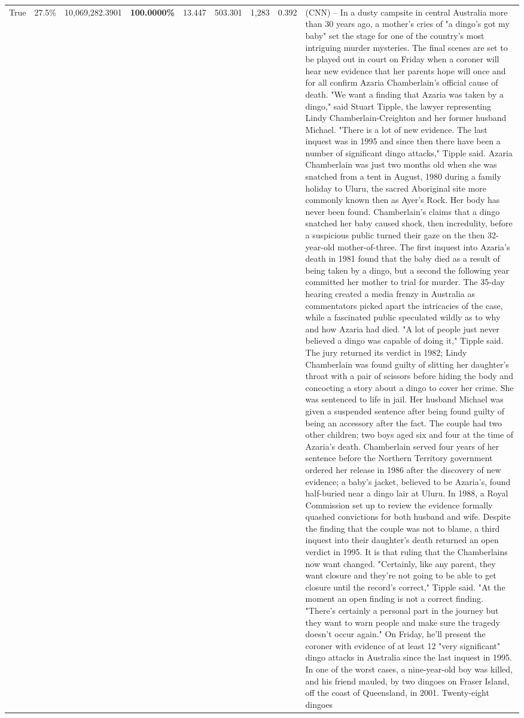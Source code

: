 \begin{table}[H]
\begin{tabular}{lllrlllll}
True & 27.5\% & 10,069,282.3901 & \bfseries \color{red} 100.0000\% & 13.447 & 503.301 & 1,283 & 0.392 & (CNN) -- In a dusty campsite in central Australia more than 30 years ago, a mother's cries of "a dingo's got my baby" set the stage for one of the country's most intriguing murder mysteries. The final scenes are set to be played out in court on Friday when a coroner will hear new evidence that her parents hope will once and for all confirm Azaria Chamberlain's official cause of death. "We want a finding that Azaria was taken by a dingo," said Stuart Tipple, the lawyer representing Lindy Chamberlain-Creighton and her former husband Michael. "There is a lot of new evidence. The last inquest was in 1995 and since then there have been a number of significant dingo attacks," Tipple said. Azaria Chamberlain was just two months old when she was snatched from a tent in August, 1980 during a family holiday to Uluru, the sacred Aboriginal site more commonly known then as Ayer's Rock. Her body has never been found. Chamberlain's claims that a dingo snatched her baby caused shock, then incredulity, before a suspicious public turned their gaze on the then 32-year-old mother-of-three. The first inquest into Azaria's death in 1981 found that the baby died as a result of being taken by a dingo, but a second the following year committed her mother to trial for murder. The 35-day hearing created a media frenzy in Australia as commentators picked apart the intricacies of the case, while a fascinated public speculated wildly as to why and how Azaria had died. "A lot of people just never believed a dingo was capable of doing it," Tipple said. The jury returned its verdict in 1982; Lindy Chamberlain was found guilty of slitting her daughter's throat with a pair of scissors before hiding the body and concocting a story about a dingo to cover her crime. She was sentenced to life in jail. Her husband Michael was given a suspended sentence after being found guilty of being an accessory after the fact. The couple had two other children; two boys aged six and four at the time of Azaria's death. Chamberlain served four years of her sentence before the Northern Territory government ordered her release in 1986 after the discovery of new evidence; a baby's jacket, believed to be Azaria's, found half-buried near a dingo lair at Uluru. In 1988, a Royal Commission set up to review the evidence formally quashed convictions for both husband and wife. Despite the finding that the couple was not to blame, a third inquest into their daughter's death returned an open verdict in 1995. It is that ruling that the Chamberlains now want changed. "Certainly, like any parent, they want closure and they're not going to be able to get closure until the record's correct," Tipple said. "At the moment an open finding is not a correct finding. "There's certainly a personal part in the journey but they want to warn people and make sure the tragedy doesn't occur again." On Friday, he'll present the coroner with evidence of at least 12 "very significant" dingo attacks in Australia since the last inquest in 1995. In one of the worst cases, a nine-year-old boy was killed, and his friend mauled, by two dingoes on Fraser Island, off the coast of Queensland, in 2001. Twenty-eight dingoes 
\end{tabular}
\end{table}
